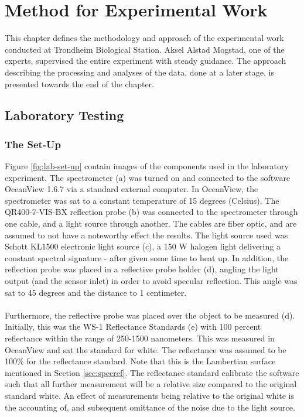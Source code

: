 \chapter{Method for Experimental Work}
\label{chap:method}
This chapter defines the methodology and approach of the experimental work conducted at Trondheim Biological Station. Aksel Alstad Mogstad, one of the experts, supervised the entire experiment with steady guidance. The approach describing the processing and analyses of the data, done at a later stage, is presented towards the end of the chapter.

\section{Laboratory Testing}

\subsection{The Set-Up}
Figure \ref{fig:lab-set-up} contain images of the components used in the laboratory experiment. The spectrometer (a) was turned on and connected to the software OceanView 1.6.7 via a standard external computer. In OceanView, the spectrometer was sat to a constant temperature of 15 degrees (Celsius). The QR400-7-VIS-BX reflection probe (b) was connected to the spectrometer through one cable, and a light source through another. The cables are fiber optic, and are assumed to not have a noteworthy effect the results. The light source used was Schott KL1500 electronic light source (c), a 150 W halogen light delivering a constant spectral signature - after given some time to heat up. In addition, the reflection probe was placed in a reflective probe holder (d), angling the light output (and the sensor inlet) in order to avoid specular reflection. This angle was sat to 45 degrees and the distance to 1 centimeter.
\\\\
Furthermore, the reflective probe was placed over the object to be measured (d). Initially, this was the WS-1 Reflectance Standards (e) with 100 percent reflectance within the range of 250-1500 nanometers. This was measured in OceanView and sat the standard for white. The reflectance was assumed to be 100\% for the reflectance standard. Note that this is the Lambertian surface mentioned in Section \ref{sec:specref}. The reflectance standard calibrate the software such that all further measurement will be a relative size compared to the original standard white. An effect of measurements being relative to the original white is the accounting of, and subsequent omittance of the noise due to the light source. 



